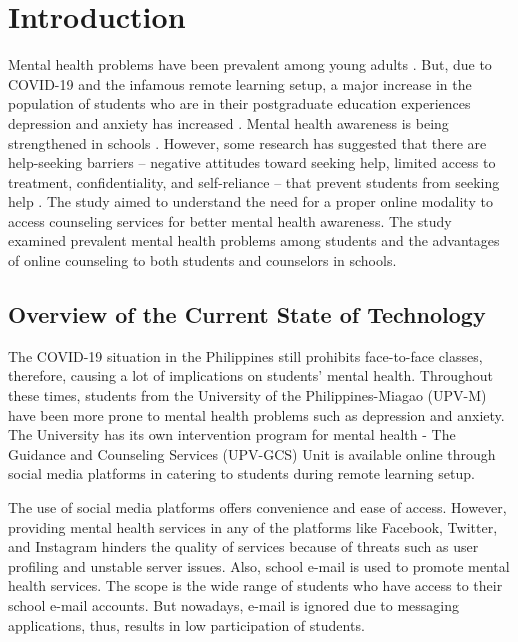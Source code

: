 \chapter{Introduction}
\label{sec:researchdesc}    %
 

Mental health problems have been prevalent among young adults \cite{hunt:2010:mental}. But, due to COVID-19 and the infamous remote learning setup, a major increase in the population of students who are in their postgraduate education experiences depression and anxiety has increased \cite{qiu2020nationwide}. Mental health awareness is being strengthened in schools \cite{hoven2008worldwide}. However, some research has suggested that there are help-seeking barriers – negative attitudes toward seeking help, limited access to treatment, confidentiality, and self-reliance – that prevent students from seeking help \cite{rickwood2005young}. The study aimed to understand the need for a proper online modality to access counseling services for better mental health awareness. The study examined prevalent mental health problems among students and the advantages of online counseling to both students and counselors in schools. 

\section{Overview of the Current State of Technology}
\label{sec:overview}

The COVID-19 situation in the Philippines still prohibits face-to-face classes, therefore, causing a lot of implications on students’ mental health. Throughout these times, students from the University of the Philippines-Miagao (UPV-M) have been more prone to mental health problems such as depression and anxiety. The University has its own intervention program for mental health - The Guidance and Counseling Services (UPV-GCS) Unit is available online through social media platforms in catering to students during remote learning setup. 

The use of social media platforms offers convenience and ease of access. However, providing mental health services in any of the platforms like Facebook, Twitter, and Instagram hinders the quality of services because of threats such as user profiling and unstable server issues.  Also, school e-mail is used to promote mental health services. The scope is the wide range of students who have access to their school e-mail accounts. But nowadays, e-mail is ignored due to messaging applications, thus, results in low participation of students. 

